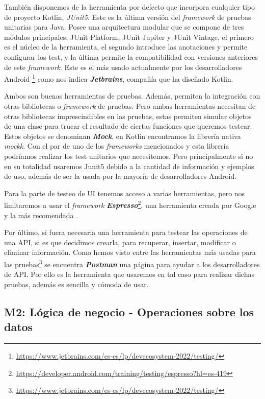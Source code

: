También disponemos de la herramienta por defecto que incorpora cualquier tipo de proyecto Kotlin, 
\textit{JUnit5}. Este es la última versión del \textit{framework} de pruebas unitarias para Java. Posee 
una arquitectura modular que se compone de tres módulos principales: JUnit Platform, JUnit Jupiter y 
JUnit Vintage, el primero es el núcleo de la herramienta, el segundo introduce las anotaciones y 
permite configurar los test, y la última permite la compatibilidad con versiones anteriores de este 
\textit{framework}. Este es el más usado actualmente por los desarrolladores Android 
\footnote{\url{https://www.jetbrains.com/es-es/lp/devecosystem-2022/testing/}} como nos indica 
\textbf{\textit{Jetbrains}}, compañía que ha diseñado Kotlin.

Ambos son buenas herramientas de pruebas. Además, permiten la integración con otras bibliotecas o 
\textit{framework} de pruebas. Pero ambas herramientas necesitan de otras bibliotecas imprescindibles 
en las pruebas, estas permiten simular objetos de una clase para trucar el resultado de ciertas 
funciones que queremos testear. Estos objetos se denominan \textbf{\textit{Mock}}, en Kotlin 
encontramos la librería nativa \textit{mockk}. Con el par de uno de los \textit{frameworks} 
mencionados y esta librería podríamos realizar los test unitarios que necesitemos. Pero principalmente 
si no en su totalidad usaremos Junit5 debido a la cantidad de información y ejemplos de uso, además de 
ser la usada por la mayoría de desarrolladores Android.

Para la parte de testeo de UI tenemos acceso a varias herramientas, pero nos limitaremos a usar el 
\textit{framework} \textbf{\textit{Espresso}}\footnote{\url{https://developer.android.com/training/testing/espresso?hl=es-419}}, una herramienta creada por Google y la más recomendada \cite{UITest}.

Por último, si fuera necesaria una herramienta para testear las operaciones de una API, si es que 
decidimos crearla, para  recuperar, insertar, modificar o eliminar información. Como hemos visto entre 
las herramientas más usadas para las pruebas\footnote{\url{https://www.jetbrains.com/es-es/lp/devecosystem-2022/testing/}} se encuentra \textit{\textbf{Postman}} una página para ayudar a los 
desarrolladores de API. Por ello es la herramienta que usaremos en tal caso para realizar dichas 
pruebas, además es sencilla y cómoda de usar.

\subsection{M2: Lógica de negocio - Operaciones sobre los datos}


